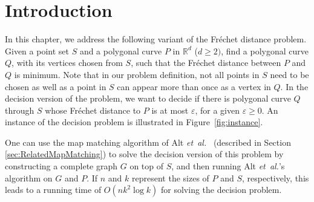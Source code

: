 \documentclass[12pt]{dalthesis}
\newcommand{\IR}{\ensuremath{\mathbb{R}}}
\newcommand{\gee}{\geqslant}
\newcommand{\eps}{\varepsilon}
\newcommand{\etal}{{\em et~al.\/}}
\newcommand{\REM}[1]{}
\newcommand{\Frechet}{Fr\'echet }
\newcommand{\pset}{S}
\begin{document}
\section{Introduction}

\REM{
Matching two geometric patterns is a fundamental problem in pattern recognition,
protein structure prediction, computer vision, geographic information systems, etc.
Usually these patterns consist of line segments and polygonal curves. 

One of the most popular ways to measure the similarity of two curves is
to use the \Frechet distance. 
An intuitive way to illustrate the \Frechet distance is as follows.
Imagine a person walking his/her dog, where the person and the dog, 
each travels a pre-specified curve, from beginning to the end, 
without ever letting go of the leash or backtracking.
The \Frechet distance between the two curves is the minimum length of a leash which is necessary.
The leash length determines how similar the two curves are to each other:
a short leash means the curves are similar,
and a long leash means that the curves are different from each other.

Two problem instances naturally arise:  decision and optimization.
In the {\em decision problem}, one wants to decide whether two polygonal curves $P$  and $Q$
are within~$\eps$ \Frechet distance to each other. In the {\em optimization problem}, one wishes to determine the minimum such~$\eps$.
Alt and Godau~\cite{AltG95} presented an $O(n^2)$-time algorithm for the decision problem,
where $n$ denotes the total number of segments in the curves.
They also solved the corresponding optimization problem in $O(n^2\log n)$ time.
}
In this chapter, we address the following variant of the \Frechet distance problem.
Given a point set $S$ and a polygonal curve $P$ in $\IR^d$ ($d \gee 2)$,
find a polygonal curve $Q$, with its vertices chosen from $S$, 
such that the \Frechet distance between $P$ and $Q$ is minimum.
Note that in our problem definition, 
not all points in $\pset$ need to be chosen as well as 
a point in $\pset$ can appear more than 
once as a vertex  in $Q$. 
In the decision version of the problem,
we want to decide if there is polygonal curve $Q$ through $S$
whose \Frechet distance to $P$ is at most $\eps$, for a given $\eps \gee 0$.
An instance of the decision problem is illustrated in Figure~\ref{fig:instance}.

One can use the map matching algorithm of Alt \etal~\cite{AltERW03a} (described in 
Section \ref{sec:RelatedMapMatching})
to solve the decision version of this problem 
by constructing a complete graph $G$ on top of $S$,
and then running Alt \etal's algorithm on $G$ and $P$.
If $n$ and $k$ represent the sizes of $P$ and $S$, respectively,
this leads to a running time of $O(nk^2 \log k)$ 
for solving the decision problem.
\end{document}
